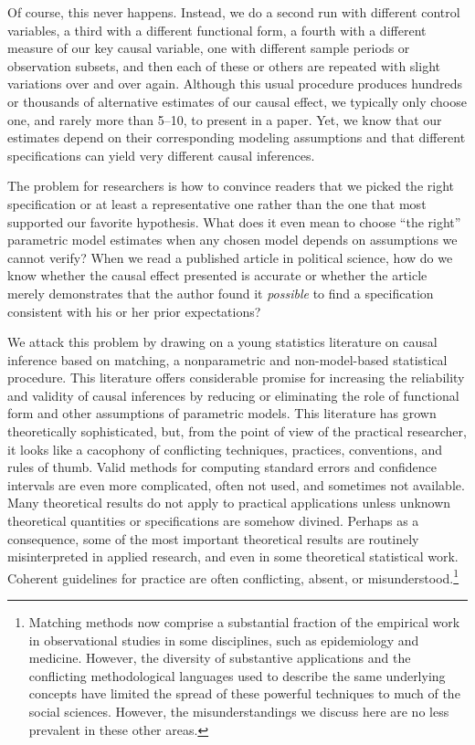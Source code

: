 \documentclass[11pt,titlepage]{article}
\begin{document}
Of course, this never happens.  Instead, we do a second run with
different control variables, a third with a different functional form,
a fourth with a different measure of our key causal variable, one with
different sample periods or observation subsets, and then each of
these or others are repeated with slight variations over and over
again.  Although this usual procedure produces hundreds or thousands
of alternative estimates of our causal effect, we typically only
choose one, and rarely more than 5--10, to present in a paper.  Yet,
we know that our estimates depend on their corresponding modeling
assumptions and that different specifications can yield very different
causal inferences.

The problem for researchers is how to convince readers that we picked
the right specification or at least a representative one rather than
the one that most supported our favorite hypothesis.  What does it
even mean to choose ``the right'' parametric model estimates when any
chosen model depends on assumptions we cannot verify?  When we read a
published article in political science, how do we know whether the
causal effect presented is accurate or whether the article merely
demonstrates that the author found it \emph{possible} to find a
specification consistent with his or her prior expectations?

We attack this problem by drawing on a young statistics literature on
causal inference based on matching, a nonparametric and
non-model-based statistical procedure.  This literature offers
considerable promise for increasing the reliability and validity of
causal inferences by reducing or eliminating the role of functional
form and other assumptions of parametric models.  This literature has
grown theoretically sophisticated, but, from the point of view of the
practical researcher, it looks like a cacophony of conflicting
techniques, practices, conventions, and rules of thumb.  Valid methods
for computing standard errors and confidence intervals are even more
complicated, often not used, and sometimes not available.  Many
theoretical results do not apply to practical applications unless
unknown theoretical quantities or specifications are somehow divined.
Perhaps as a consequence, some of the most important theoretical
results are routinely misinterpreted in applied research, and even in
some theoretical statistical work.  Coherent guidelines for practice
are often conflicting, absent, or misunderstood.\footnote{Matching
  methods now comprise a substantial fraction of the empirical work in
  observational studies in some disciplines, such as epidemiology and
  medicine.  However, the diversity of substantive applications and
  the conflicting methodological languages used to describe the same
  underlying concepts have limited the spread of these powerful
  techniques to much of the social sciences.  However, the
  misunderstandings we discuss here are no less prevalent in these
  other areas.}
\end{document}
